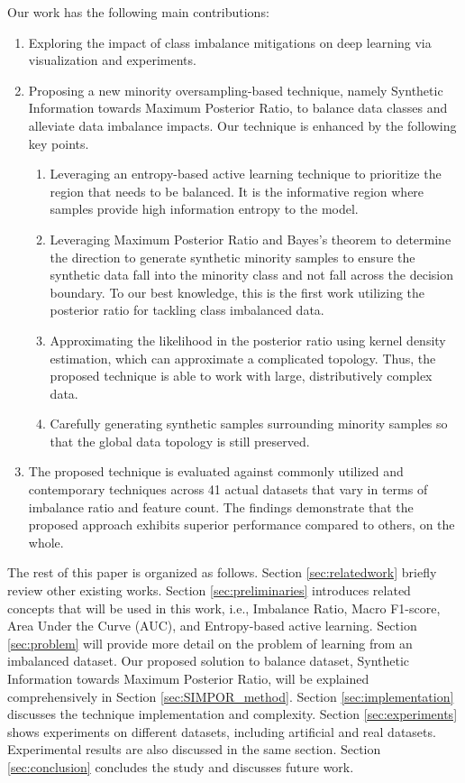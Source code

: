 \documentclass[journal]{IEEEtai}
\newcommand{\MethodnameLong}{Synthetic Information towards Maximum Posterior Ratio}
\begin{document}
Our work has the following main contributions:
\begin{enumerate}
	\item{Exploring the impact of class imbalance mitigations on deep learning via visualization and experiments.}
	\item{Proposing a new minority oversampling-based technique, namely \MethodnameLong, to balance data classes and alleviate data imbalance impacts. Our technique is enhanced by the following key points.}
	\begin{enumerate}
		\item Leveraging an entropy-based active learning technique to prioritize the region that needs to be balanced. It is the informative region where samples provide high information entropy to the model. 
		\item Leveraging Maximum Posterior Ratio and Bayes's theorem to determine the direction to generate synthetic minority samples to ensure the synthetic data fall into the minority class and not fall across the decision boundary. To our best knowledge, this is the first work utilizing the posterior ratio for tackling class imbalanced data. 
		\item Approximating the likelihood in the posterior ratio using kernel density estimation, which can approximate a complicated topology. Thus, the proposed technique is able to work with large, distributively complex data. 
		\item Carefully generating synthetic samples surrounding minority samples so that the global data topology is still preserved. 
	\end{enumerate}
	\item{The proposed technique is evaluated against commonly utilized and contemporary techniques across 41 actual datasets that vary in terms of imbalance ratio and feature count. The findings demonstrate that the proposed approach exhibits superior performance compared to others, on the whole.}
\end{enumerate}


The rest of this paper is organized as follows. Section \ref{sec:relatedwork} briefly review other existing works. Section \ref{sec:preliminaries} introduces related concepts that will be used in this work, i.e., Imbalance Ratio, Macro F1-score, Area Under the Curve (AUC), and Entropy-based active learning. Section \ref{sec:problem} will provide more detail on the problem of learning from an imbalanced dataset. Our proposed solution to balance dataset, \MethodnameLong, will be explained comprehensively in Section \ref{sec:SIMPOR_method}. Section \ref{sec:implementation} discusses the technique implementation and complexity.  Section \ref{sec:experiments} shows experiments on different datasets, including artificial and real datasets. Experimental results are also discussed in the same section. Section \ref{sec:conclusion} concludes the study and discusses future work. 
\end{document}
